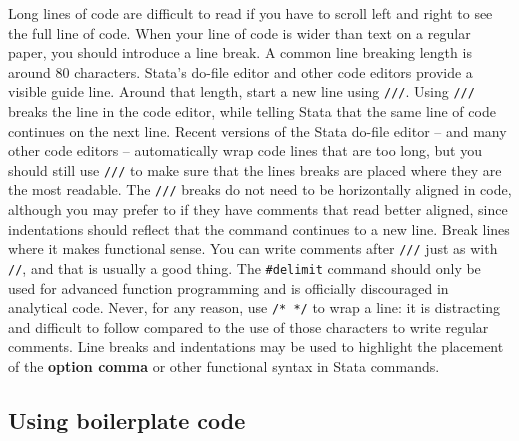 Long lines of code are difficult to read if you have to scroll left and right to see the full line of code.
When your line of code is wider than text on a regular paper, you should introduce a line break.
A common line breaking length is around 80 characters.
Stata's do-file editor and other code editors provide a visible guide line.
Around that length, start a new line using \texttt{///}.
Using \texttt{///} breaks the line in the code editor,
while telling Stata that the same line of code continues on the next line.
Recent versions of the Stata do-file editor --
and many other code editors --
automatically wrap code lines that are too long,
but you should still use \texttt{///} 
to make sure that the lines breaks are placed 
where they are the most readable.
The \texttt{///} breaks do not need to be horizontally aligned in code,
although you may prefer to if they have comments that read better aligned,
since indentations should reflect that the command continues to a new line.
Break lines where it makes functional sense.
You can write comments after \texttt{///} just as with \texttt{//}, and that is usually a good thing.
The \texttt{\#delimit} command should only be used for advanced function programming
and is officially discouraged in analytical code.\cite{cox2005styleguide}
Never, for any reason, use \texttt{/* */} to wrap a line:
it is distracting and difficult to follow compared to the use
of those characters to write regular comments.
Line breaks and indentations may be used to highlight the placement
of the \textbf{option comma} or other functional syntax in Stata commands.


\subsection{Using boilerplate code}

